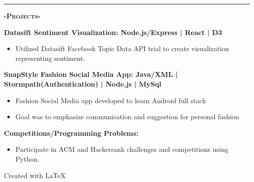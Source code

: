 \documentclass[12pt]{article}
\begin{document}
\noindent\rule{19cm}{0.4pt}

\begin{center}
\textbf{\textsc{-Projects-}}\\
\end{center}
\begin{footnotesize}

\flushleft

\color{Cerulean}\textbf{Datasift Sentiment Visualization: \hfill \color{TealBlue} Node.js/Express | React | D3} 
\color{Black}
\begin{itemize}
	\item Utilized Datasift Facebook Topic Data API trial to create visualization representing sentiment.
\end{itemize}
\smallskip
\flushleft
\color{Cerulean}\textbf{SnapStyle Fashion Social Media App: \hfill\color{TealBlue} Java/XML | Stormpath(Authentication) | Node.js | MySql} 
\color{Black}
\begin{itemize}
	\item Fashion Social Media app developed to learn Android full stack
	\item Goal was to emphasize communication and suggestion for personal fashion
\end{itemize}
\smallskip
\setlength\parindent{0pt}
\color{Cerulean}\textbf{Competitions/Programming Problems:}
\color{Black}
\begin{itemize}
	\item Participate in ACM and Hackerrank challenges and competitions using \color{TealBlue}Python.\color{Black}
\end{itemize}
\smallskip

\end{footnotesize}

\center
Created with \LaTeX
\end{document}
